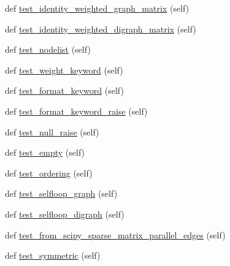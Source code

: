 \begin{DoxyCompactItemize}
\item 
def \hyperlink{classnetworkx_1_1tests_1_1test__convert__scipy_1_1TestConvertScipy_ab480dd86dd3b5c14171e3dcc313b4f19}{test\+\_\+identity\+\_\+weighted\+\_\+graph\+\_\+matrix} (self)
\item 
def \hyperlink{classnetworkx_1_1tests_1_1test__convert__scipy_1_1TestConvertScipy_a147073b4e1b3b52197974e08814c90a8}{test\+\_\+identity\+\_\+weighted\+\_\+digraph\+\_\+matrix} (self)
\item 
def \hyperlink{classnetworkx_1_1tests_1_1test__convert__scipy_1_1TestConvertScipy_adfc3e4b27832ff194cb67358ca5e9538}{test\+\_\+nodelist} (self)
\item 
def \hyperlink{classnetworkx_1_1tests_1_1test__convert__scipy_1_1TestConvertScipy_a03207f8a7089efe30884ceb683b09f37}{test\+\_\+weight\+\_\+keyword} (self)
\item 
def \hyperlink{classnetworkx_1_1tests_1_1test__convert__scipy_1_1TestConvertScipy_a01bd6e3b4f297f6d8a613c79ea3a317e}{test\+\_\+format\+\_\+keyword} (self)
\item 
def \hyperlink{classnetworkx_1_1tests_1_1test__convert__scipy_1_1TestConvertScipy_a6025869050ddb48e5d2ef8dbe9a895d2}{test\+\_\+format\+\_\+keyword\+\_\+raise} (self)
\item 
def \hyperlink{classnetworkx_1_1tests_1_1test__convert__scipy_1_1TestConvertScipy_a8daefeebf7cfd0bda3dcf15c165f2cc8}{test\+\_\+null\+\_\+raise} (self)
\item 
def \hyperlink{classnetworkx_1_1tests_1_1test__convert__scipy_1_1TestConvertScipy_a9eb329eec45265561704afa640f04860}{test\+\_\+empty} (self)
\item 
def \hyperlink{classnetworkx_1_1tests_1_1test__convert__scipy_1_1TestConvertScipy_aa20ff16021e759a3f97b993140701183}{test\+\_\+ordering} (self)
\item 
def \hyperlink{classnetworkx_1_1tests_1_1test__convert__scipy_1_1TestConvertScipy_aa5c7d52e565dec541a43b5a1df649f41}{test\+\_\+selfloop\+\_\+graph} (self)
\item 
def \hyperlink{classnetworkx_1_1tests_1_1test__convert__scipy_1_1TestConvertScipy_aad3796b31c69a94fe8e2cd8f098b0658}{test\+\_\+selfloop\+\_\+digraph} (self)
\item 
def \hyperlink{classnetworkx_1_1tests_1_1test__convert__scipy_1_1TestConvertScipy_a31de609b385d27b54e5f8ba0f4c01b50}{test\+\_\+from\+\_\+scipy\+\_\+sparse\+\_\+matrix\+\_\+parallel\+\_\+edges} (self)
\item 
def \hyperlink{classnetworkx_1_1tests_1_1test__convert__scipy_1_1TestConvertScipy_a2ed8b56e971135797fcabf8a847bc34b}{test\+\_\+symmetric} (self)
\end{DoxyCompactItemize}

